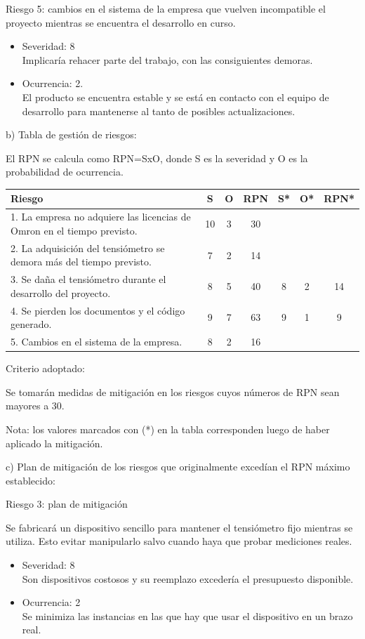 \documentclass[
11pt, %
]{charter}
\begin{document}
Riesgo 5: cambios en el sistema de la empresa que vuelven incompatible el proyecto mientras se encuentra el desarrollo en curso.
\begin{itemize}
	\item Severidad: 8\\
	Implicaría rehacer parte del trabajo, con las consiguientes demoras.
	\item Ocurrencia: 2.\\
	El producto se encuentra estable y se está en contacto con el equipo de desarrollo para mantenerse al tanto de posibles actualizaciones.
\end{itemize}

b) Tabla de gestión de riesgos:
      
El RPN se calcula como RPN=SxO, donde S es la severidad y O es la probabilidad de ocurrencia.

\begin{table}[htpb]
\centering
\begin{tabularx}{\linewidth}{@{}|X|c|c|c|c|c|c|@{}}
\hline
\rowcolor[HTML]{C0C0C0}
Riesgo & S & O & RPN & S* & O* & RPN* \\ \hline
1. La empresa no adquiere las licencias de Omron en el tiempo previsto. &  10 & 3  & 30 &  &  &      \\ \hline
2. La adquisición del tensiómetro se demora más del tiempo previsto. & 7  & 2  & 14 &   &    &      \\ \hline
3. Se daña el tensiómetro durante el desarrollo del proyecto. & 8 & 5 & 40	 & 8 & 2 & 14 \\ \hline
4. Se pierden los documentos y el código generado. & 9 & 7 & 63 & 9 & 1 & 9 \\ \hline
5. Cambios en el sistema de la empresa. & 8 & 2  & 16 & & &  \\ \hline
\end{tabularx}%
\end{table}

Criterio adoptado:

Se tomarán medidas de mitigación en los riesgos cuyos números de RPN sean mayores a 30.

Nota: los valores marcados con (*) en la tabla corresponden luego de haber aplicado la mitigación.

c) Plan de mitigación de los riesgos que originalmente excedían el RPN máximo establecido:

Riesgo 3: plan de mitigación 

Se fabricará un dispositivo sencillo para mantener el tensiómetro fijo mientras se utiliza. Esto evitar manipularlo salvo cuando haya que probar mediciones reales.          
  \begin{itemize}
	\item Severidad: 8 \\
	Son dispositivos costosos y su reemplazo excedería el presupuesto disponible.          
	\item Ocurrencia: 2 \\
	Se minimiza las instancias en las que hay que usar el dispositivo en un brazo real.
	\end{itemize}
\end{document}
